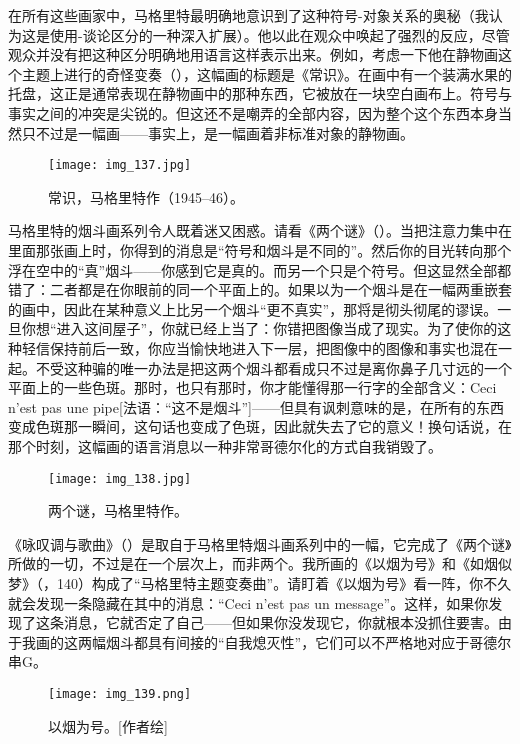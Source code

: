 在所有这些画家中，马格里特最明确地意识到了这种符号-对象关系的奥秘（我认为这是使用-谈论区分的一种深入扩展）。他以此在观众中唤起了强烈的反应，尽管观众并没有把这种区分明确地用语言这样表示出来。例如，考虑一下他在静物画这个主题上进行的奇怪变奏（），这幅画的标题是《常识》。在画中有一个装满水果的托盘，这正是通常表现在静物画中的那种东西，它被放在一块空白画布上。符号与事实之间的冲突是尖锐的。但这还不是嘲弄的全部内容，因为整个这个东西本身当然只不过是一幅画——事实上，是一幅画着非标准对象的静物画。

\begin{figure}
\texttt{[image: img\_137.jpg]}
\caption[常识，马格里特作。]
  {常识，马格里特作（1945--46）。}
\end{figure}

马格里特的烟斗画系列令人既着迷又困惑。请看《两个谜》（）。当把注意力集中在里面那张画上时，你得到的消息是“符号和烟斗是不同的”。然后你的目光转向那个浮在空中的“真”烟斗——你感到它是真的。而另一个只是个符号。但这显然全部都错了：二者都是在你眼前的同一个平面上的。如果以为一个烟斗是在一幅两重嵌套的画中，因此在某种意义上比另一个烟斗“更不真实”，那将是彻头彻尾的谬误。一旦你想“进入这间屋子”，你就已经上当了：你错把图像当成了现实。为了使你的这种轻信保持前后一致，你应当愉快地进入下一层，把图像中的图像和事实也混在一起。不受这种骗的唯一办法是把这两个烟斗都看成只不过是离你鼻子几寸远的一个平面上的一些色斑。那时，也只有那时，你才能懂得那一行字的全部含义：Ceci n'est pas une pipe[法语：“这不是烟斗”]——但具有讽刺意味的是，在所有的东西变成色斑那一瞬间，这句话也变成了色斑，因此就失去了它的意义！换句话说，在那个时刻，这幅画的语言消息以一种非常哥德尔化的方式自我销毁了。

\begin{figure}
\texttt{[image: img\_138.jpg]}
\caption[两个谜，马格里特作。]
  {两个谜，马格里特作。}
\end{figure}

《咏叹调与歌曲》（）是取自于马格里特烟斗画系列中的一幅，它完成了《两个谜》所做的一切，不过是在一个层次上，而非两个。我所画的《以烟为号》和《如烟似梦》（，140）构成了“马格里特主题变奏曲”。请盯着《以烟为号》看一阵，你不久就会发现一条隐藏在其中的消息：“Ceci n'est pas un message”\lnote{[法文：“这不是消息”]}。这样，如果你发现了这条消息，它就否定了自己——但如果你没发现它，你就根本没抓住要害。由于我画的这两幅烟斗都具有间接的“自我熄灭性”，它们可以不严格地对应于哥德尔串G。

\begin{figure}
\texttt{[image: img\_139.png]}
\caption[以烟为号。]
  {以烟为号。[作者绘] }
\end{figure}

